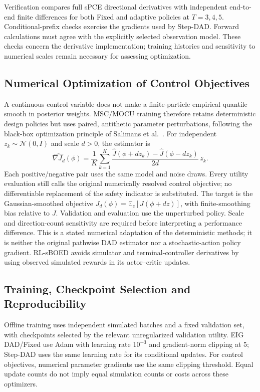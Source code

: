 \documentclass[journal]{IEEEtran}
\newcommand{\E}{\mathbb{E}}
\begin{document}
Verification compares full sPCE directional derivatives with independent
end-to-end finite differences for both Fixed and adaptive policies at
$T=3,4,5$. Conditional-prefix checks exercise the gradients used by Step-DAD.
Forward calculations must agree with the explicitly selected observation model.
These checks concern the derivative implementation; training histories and
sensitivity to numerical scales remain necessary for assessing optimization.

\subsection{Numerical Optimization of Control Objectives}
A continuous control variable does not make a finite-particle empirical
quantile smooth in posterior weights. MSC/MOCU training therefore retains
deterministic design policies but uses paired, antithetic parameter
perturbations, following the black-box optimization principle of
Salimans et al.~\cite{salimans2017es}. For independent
$z_k\sim\mathcal N(0,I)$ and scale $d>0$, the estimator is
\begin{equation}
\widehat{\nabla J_d}(\phi)=\frac1K\sum_{k=1}^K
\frac{\widehat J(\phi+d z_k)-\widehat J(\phi-d z_k)}{2d}\,z_k.
\label{eq:numerical-gradient}
\end{equation}
Each positive/negative pair uses the same model and noise draws. Every utility
evaluation still calls the original numerically resolved control objective;
no differentiable replacement of the safety indicator is substituted.
The target is the Gaussian-smoothed objective
$J_d(\phi)=\E_z[J(\phi+dz)]$, with finite-smoothing bias relative to $J$.
Validation and evaluation use the unperturbed policy. Scale and direction-count
sensitivity are required before interpreting a performance difference.
This is a stated numerical adaptation of the deterministic methods; it is
neither the original pathwise DAD estimator nor a stochastic-action policy
gradient. RL-sBOED avoids simulator and terminal-controller derivatives by
using observed simulated rewards in its actor--critic updates.

\subsection{Training, Checkpoint Selection and Reproducibility}
Offline training uses independent simulated batches and a fixed validation
set, with checkpoints selected by the relevant unregularized validation
utility. EIG DAD/Fixed use Adam with learning rate $10^{-3}$ and gradient-norm
clipping at 5; Step-DAD uses the same learning rate for its conditional updates.
For control objectives, numerical parameter gradients use the same clipping
threshold. Equal update counts do not imply equal simulation counts or costs
across these optimizers.
\end{document}
